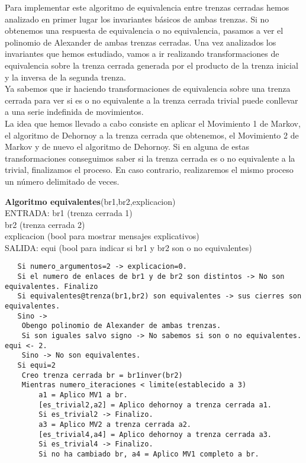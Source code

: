 Para implementar este algoritmo de equivalencia entre trenzas cerradas hemos analizado en primer lugar los invariantes básicos de ambas trenzas. Si no obtenemos una respuesta de equivalencia  o no equivalencia, pasamos a ver el polinomio de Alexander de ambas trenzas cerradas. Una vez analizados los invariantes que hemos estudiado, vamos a ir realizando transformaciones de equivalencia sobre la trenza cerrada generada por el producto de la trenza inicial y la inversa de la segunda trenza. \\

Ya sabemos que ir haciendo transformaciones de equivalencia sobre una trenza cerrada para ver si es o no equivalente a la trenza cerrada trivial puede conllevar a una serie indefinida de movimientos. \\

La idea que hemos llevado a cabo consiste en aplicar el Movimiento 1 de Markov, el algoritmo de Dehornoy a la trenza cerrada que obtenemos, el Movimiento 2 de Markov y de nuevo el algoritmo de Dehornoy. Si en alguna de estas transformaciones conseguimos saber si la trenza cerrada es o no equivalente a la trivial, finalizamos el proceso. En caso contrario, realizaremos el mismo proceso un número delimitado de veces. \\

\begin{alg}
	\textbf{Algoritmo equivalentes}(br1,br2,explicacion)\\
	ENTRADA: br1 (trenza cerrada 1)\\
	\hspace*{2.2cm} br2 (trenza cerrada 2)\\
	\hspace*{2.2cm} explicacion (bool para mostrar mensajes explicativos)\\
	SALIDA: \hspace{0.4cm} equi (bool para indicar si br1 y br2 son o no equivalentes)
	
\begin{lstlisting}
   Si numero_argumentos=2 -> explicacion=0.
   Si el numero de enlaces de br1 y de br2 son distintos -> No son equivalentes. Finalizo
   Si equivalentes@trenza(br1,br2) son equivalentes -> sus cierres son equivalentes.
   Sino ->   
   	Obengo polinomio de Alexander de ambas trenzas.
	Si son iguales salvo signo -> No sabemos si son o no equivalentes. equi <- 2.
	Sino -> No son equivalentes.
   Si equi=2
    Creo trenza cerrada br = br1inver(br2)
    Mientras numero_iteraciones < limite(establecido a 3)
	    a1 = Aplico MV1 a br.
	    [es_trivial2,a2] = Aplico dehornoy a trenza cerrada a1. 
	    Si es_trivial2 -> Finalizo.
	    a3 = Aplico MV2 a trenza cerrada a2.
	    [es_trivial4,a4] = Aplico dehornoy a trenza cerrada a3. 
	    Si es_trivial4 -> Finalizo.
	    Si no ha cambiado br, a4 = Aplico MV1 completo a br. 
	   
\end{lstlisting}
\end{alg}

